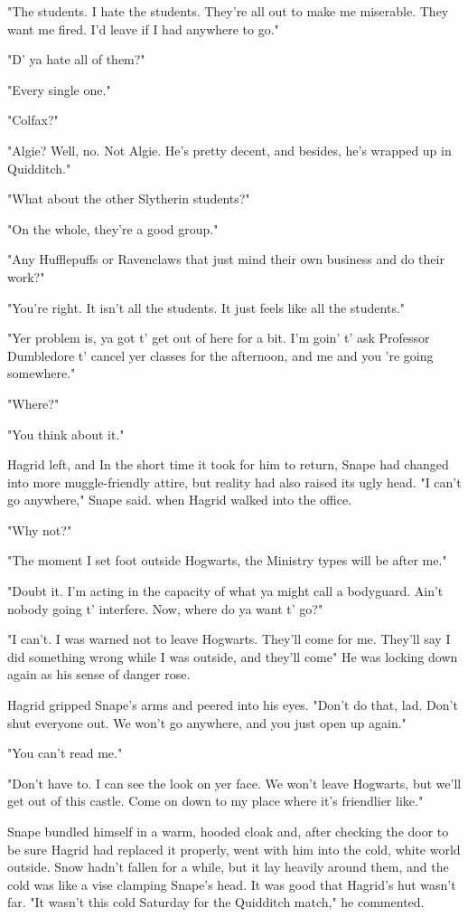 "The students. I hate the students. They're all out to make me miserable. They want me fired. I'd leave if I had anywhere to go."

"D' ya hate all of them?"

"Every single one."

"Colfax?"

"Algie? Well, no. Not Algie. He's pretty decent, and besides, he's wrapped up in Quidditch."

"What about the other Slytherin students?"

"On the whole, they're a good group."

"Any Hufflepuffs or Ravenclaws that just mind their own business and do their work?"

"You're right. It isn't all the students. It just feels like all the students."

"Yer problem is, ya got t' get out of here for a bit. I'm goin' t' ask Professor Dumbledore t' cancel yer classes for the afternoon, and me and you 're going somewhere."

"Where?"

"You think about it."

Hagrid left, and In the short time it took for him to return, Snape had changed into more muggle-friendly attire, but reality had also raised its ugly head. "I can't go anywhere," Snape said. when Hagrid walked into the office.

"Why not?"

"The moment I set foot outside Hogwarts, the Ministry types will be after me."

"Doubt it. I'm acting in the capacity of what ya might call a bodyguard. Ain't nobody going t' interfere. Now, where do ya want t' go?"

"I can't. I was warned not to leave Hogwarts. They'll come for me. They'll say I did something wrong while I was outside, and they'll come{\el}" He was locking down again as his sense of danger rose.

Hagrid gripped Snape's arms and peered into his eyes. "Don't do that, lad. Don't shut everyone out. We won't go anywhere, and you just open up again."

"You can't read me."

"Don't have to. I can see the look on yer face. We won't leave Hogwarts, but we'll get out of this castle. Come on down to my place where it's friendlier like."

Snape bundled himself in a warm, hooded cloak and, after checking the door to be sure Hagrid had replaced it properly, went with him into the cold, white world outside. Snow hadn't fallen for a while, but it lay heavily around them, and the cold was like a vise clamping Snape's head. It was good that Hagrid's hut wasn't far. "It wasn't this cold Saturday for the Quidditch match," he commented.

